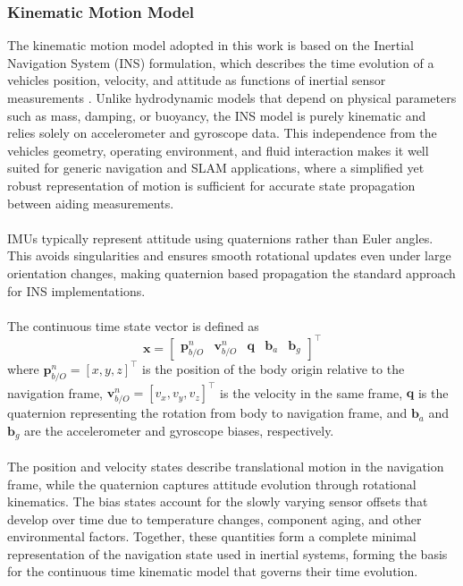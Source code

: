 \newpage



\subsubsection{Kinematic Motion Model}
The kinematic motion model adopted in this work is based on the Inertial Navigation System (INS) formulation, which describes the time evolution of a vehicles position, velocity, and attitude as functions of inertial sensor measurements \cite{sensor_fusion_book}. Unlike hydrodynamic models that depend on physical parameters such as mass, damping, or buoyancy, the INS model is purely kinematic and relies solely on accelerometer and gyroscope data. This independence from the vehicles geometry, operating environment, and fluid interaction makes it well suited for generic navigation and SLAM applications, where a simplified yet robust representation of motion is sufficient for accurate state propagation between aiding measurements.
\\ \\
IMUs typically represent attitude using quaternions rather than Euler angles. This avoids singularities and ensures smooth rotational updates even under large orientation changes, making quaternion based propagation the standard approach for INS implementations.  
\\ \\
The continuous time state vector is defined as
$$
    \mathbf{x} =
    \begin{bmatrix}
        \mathbf{p}_{b/O}^{n} & \mathbf{v}_{b/O}^{n} & \mathbf{q} & \mathbf{b}_a & \mathbf{b}_g
    \end{bmatrix}^\top
$$
where $\mathbf{p}_{b/O}^{n} = [x, y, z]^\top$ is the position of the body origin relative to the navigation frame, $\mathbf{v}_{b/O}^{n} = [v_x, v_y, v_z]^\top$ is the velocity in the same frame, $\mathbf{q}$ is the quaternion representing the rotation from body to navigation frame, and $\mathbf{b}_a$ and $\mathbf{b}_g$ are the accelerometer and gyroscope biases, respectively.  
\\ \\
The position and velocity states describe translational motion in the navigation frame, while the quaternion captures attitude evolution through rotational kinematics. The bias states account for the slowly varying sensor offsets that develop over time due to temperature changes, component aging, and other environmental factors. Together, these quantities form a complete minimal representation of the navigation state used in inertial systems, forming the basis for the continuous time kinematic model that governs their time evolution.  

